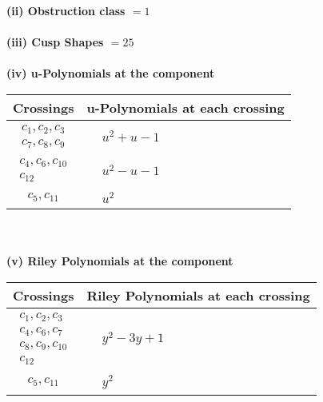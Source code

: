 \documentclass[1p]{elsarticle_modified}
\theoremstyle{definition}
\begin{document}
\flushleft \textbf{(ii) Obstruction class $= 1$}\\~\\
\flushleft \textbf{(iii) Cusp Shapes $= 25$}\\~\\
\newpage\renewcommand{\arraystretch}{1}
\flushleft \textbf{(iv) u-Polynomials at the component}\newline \\
\begin{tabular}{m{50pt}|m{274pt}}
Crossings & \hspace{64pt}u-Polynomials at each crossing \\
\hline $$\begin{aligned}c_{1},c_{2},c_{3}\\c_{7},c_{8},c_{9}\end{aligned}$$&$\begin{aligned}
&u^2+u-1
\end{aligned}$\\
\hline $$\begin{aligned}c_{4},c_{6},c_{10}\\c_{12}\end{aligned}$$&$\begin{aligned}
&u^2- u-1
\end{aligned}$\\
\hline $$\begin{aligned}c_{5},c_{11}\end{aligned}$$&$\begin{aligned}
&u^2
\end{aligned}$\\
\hline
\end{tabular}\\~\\
\newpage\renewcommand{\arraystretch}{1}
\flushleft \textbf{(v) Riley Polynomials at the component}\newline \\
\begin{tabular}{m{50pt}|m{274pt}}
Crossings & \hspace{64pt}Riley Polynomials at each crossing \\
\hline $$\begin{aligned}c_{1},c_{2},c_{3}\\c_{4},c_{6},c_{7}\\c_{8},c_{9},c_{10}\\c_{12}\end{aligned}$$&$\begin{aligned}
&y^2-3 y+1
\end{aligned}$\\
\hline $$\begin{aligned}c_{5},c_{11}\end{aligned}$$&$\begin{aligned}
&y^2
\end{aligned}$\\
\hline
\end{tabular}\\~\\
\end{document}
